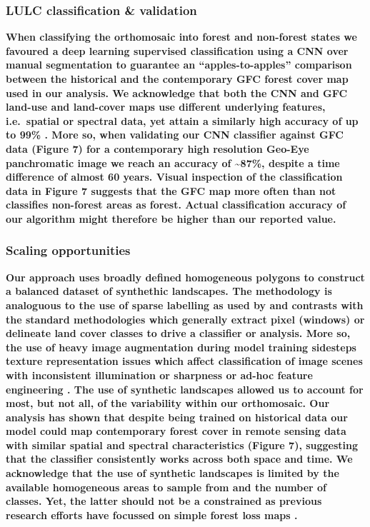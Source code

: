 \documentclass[remote sensing,article,submit,moreauthors,pdftex]{mdpi}
\begin{document}
\hypertarget{lulc-classification-validation}{%
\subsubsection{LULC classification \&
validation}\label{lulc-classification-validation}}

\textbf{When classifying the orthomosaic into forest and non-forest
states we favoured a deep learning supervised classification using a CNN
over manual segmentation to guarantee an ``apples-to-apples'' comparison
between the historical and the contemporary GFC forest cover map used in
our analysis. We acknowledge that both the CNN and GFC land-use and
land-cover maps use different underlying features, i.e.~spatial or
spectral data, yet attain a similarly high accuracy of up to 99\%
\citep{hansen2013}. More so, when validating our CNN classifier against
GFC data (Figure 7) for a contemporary high resolution Geo-Eye
panchromatic image we reach an accuracy of \textasciitilde{}87\%,
despite a time difference of almost 60 years. Visual inspection of the
classification data in Figure 7 suggests that the GFC map more often
than not classifies non-forest areas as forest. Actual classification
accuracy of our algorithm might therefore be higher than our reported
value.}

\hypertarget{scaling-opportunities}{%
\subsubsection{Scaling opportunities}\label{scaling-opportunities}}

\textbf{Our approach uses broadly defined homogeneous polygons to
construct a balanced dataset of synthethic landscapes. The methodology
is analoguous to the use of sparse labelling as used by
\citet{buscombe2018} and contrasts with the standard methodologies which
generally extract pixel (windows) \citep{song2015} or delineate land
cover classes \citep{nita2018} to drive a classifier or analysis. More
so, the use of heavy image augmentation during model training sidesteps
texture representation issues which affect classification of image
scenes with inconsistent illumination or sharpness \citep{hudak1998} or
ad-hoc feature engineering \citep{song2015}. The use of synthetic
landscapes allowed us to account for most, but not all, of the
variability within our orthomosaic. Our analysis has shown that despite
being trained on historical data our model could map contemporary forest
cover in remote sensing data with similar spatial and spectral
characteristics (Figure 7), suggesting that the classifier consistently
works across both space and time. We acknowledge that the use of
synthetic landscapes is limited by the available homogeneous areas to
sample from and the number of classes. Yet, the latter should not be a
constrained as previous research efforts have focussed on simple forest
loss maps \citep{hansen2013}.}
\end{document}
